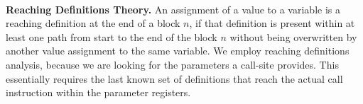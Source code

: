 ~\\
\textbf{Reaching Definitions Theory.}
\label{subsection:reachindefinitionstheory}
An assignment of a value to a variable is a reaching definition at the end of a block $n$, if that definition is present within at 
least one path from start to the end of the block $n$ without being overwritten by another value assignment to the same variable. 
We employ reaching definitions analysis, because we are looking for the parameters a call-site provides. This essentially 
requires the last known set of definitions that reach the actual call instruction within the parameter registers.


